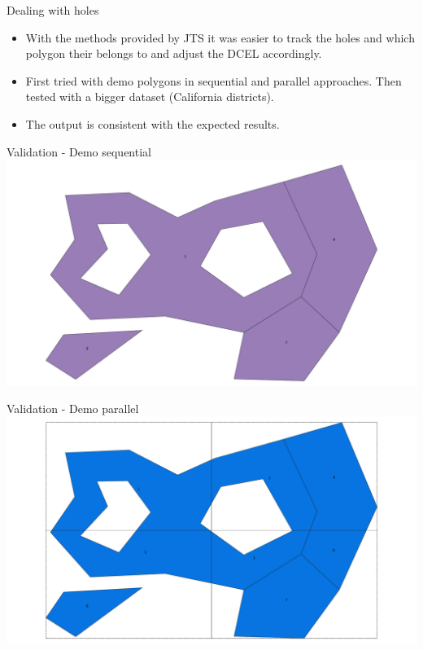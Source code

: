 \documentclass{beamer}
\begin{document}
\begin{frame}{Dealing with holes}
    \begin{itemize}
        \item With the methods provided by JTS it was easier to track the holes and which polygon their belongs to and adjust the DCEL accordingly.
        \item First tried with demo polygons in sequential and parallel approaches.  Then tested with a bigger dataset (California districts).
        \item The output is consistent with the expected results.
    \end{itemize}
\end{frame}

\begin{frame}{Validation - Demo sequential}
    \centering 
    \includegraphics[width=0.9\linewidth]{figures/Demo_sequential} 
\end{frame}

\begin{frame}{Validation - Demo parallel}
    \centering 
    \includegraphics[width=0.9\linewidth]{figures/Demo_parallel} 
\end{frame}
\end{document}
